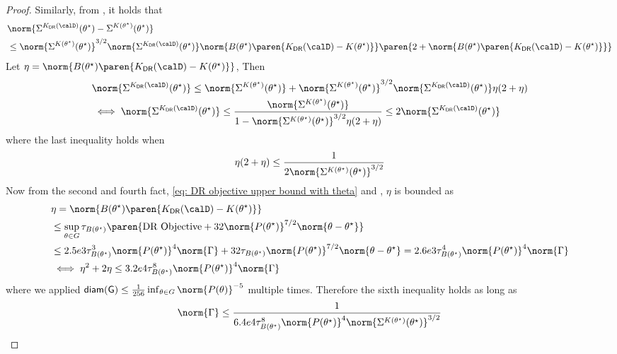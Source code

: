 \begin{proof}
    Similarly, from , it holds that
    \begin{align*}
        &\norm{\Sigma^{K_{\mathsf{DR}}(\calD)}(\theta^\star) - \Sigma^{K(\theta^\star)}(\theta^\star)} \\
        &\leq \norm{\Sigma^{K(\theta^\star)}(\theta^\star)}^{3/2}\norm{\Sigma^{K_{\mathsf{DR}}(\calD)}(\theta^\star)}\norm{B(\theta^\star)\paren{K_{\mathsf{DR}}(\calD) - K(\theta^\star)}}\paren{2 + \norm{B(\theta^\star)\paren{K_{\mathsf{DR}}(\calD) - K(\theta^\star)}}} 
    \end{align*}  
    Let $\eta = \norm{B(\theta^\star)\paren{K_{\mathsf{DR}}(\calD) - K(\theta^\star)}}$, Then
    \begin{align*}
        & \norm{\Sigma^{K_{\mathsf{DR}}(\calD)}(\theta^\star)}\leq  \norm{\Sigma^{K(\theta^\star)}(\theta^\star)}+ \norm{\Sigma^{K(\theta^\star)}(\theta^\star)}^{3/2}\norm{\Sigma^{K_{\mathsf{DR}}(\calD)}(\theta^\star)}\eta(2+\eta) \\
        &\iff \norm{\Sigma^{K_{\mathsf{DR}}(\calD)}(\theta^\star)} \leq \frac{\norm{\Sigma^{K(\theta^\star)}(\theta^\star)}}{1-\norm{\Sigma^{K(\theta^\star)}(\theta^\star)}^{3/2}\eta(2+\eta)} \leq 2\norm{\Sigma^{K_{\mathsf{DR}}(\calD)}(\theta^\star)} 
    \end{align*}
    where the last inequality holds when
    \begin{align*}
        \eta(2+\eta) \leq \frac{1}{2\norm{\Sigma^{K(\theta^\star)}(\theta^\star)}^{3/2}}
    \end{align*}
    Now from the second and fourth fact, \eqref{eq: DR objective upper bound with theta} and , $\eta$ is bounded as
    \begin{align*}
        &\eta = \norm{B(\theta^\star)\paren{K_{\mathsf{DR}}(\calD) - K(\theta^\star)}} \\
        &\leq \sup_{\theta\in G}\tau_{B(\theta^\star)}\paren{\textnormal{DR Objective} + 32 \norm{P(\theta^\star)}^{7/2} \norm{\theta-\theta^\star}} \\
        &\leq 2.5e3\tau^3_{B(\theta^\star)}\norm{P(\theta^\star)}^4 \norm{\Gamma} + 32\tau_{B(\theta^\star)}\norm{P(\theta^\star)}^{7/2}\norm{\theta-\theta^\star} = 2.6e3\tau^4_{B(\theta^\star)}\norm{P(\theta^\star)}^4\norm{\Gamma} \\
        &\iff \eta^2+2\eta \leq 3.2e4\tau^8_{B(\theta^\star)}\norm{P(\theta^\star)}^4\norm{\Gamma}
    \end{align*}
    where we applied $\mathsf{diam(G)}\leq\frac{1}{256}\inf_{\theta\in G}\norm{P(\theta)}^{-5}$ multiple times.
    Therefore the sixth inequality holds as long as
    \begin{align*}
        \norm{\Gamma} \leq \frac{1}{6.4e4\tau^8_{B(\theta^\star)}\norm{P(\theta^\star)}^4\norm{\Sigma^{K(\theta^\star)}(\theta^\star)}^{3/2}}
    \end{align*}
\end{proof}

